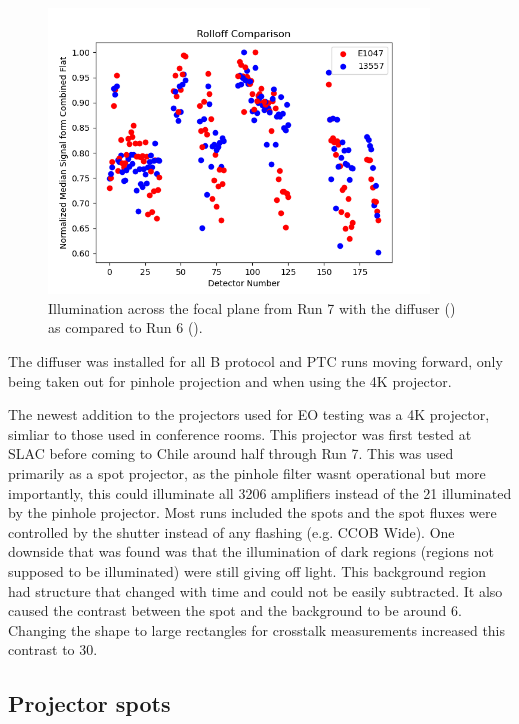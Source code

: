\begin{figure}
\centering
\includegraphics[width=0.9\textwidth]{sections/figures/Run7_DiffuserIllumination.png}
\caption{Illumination across the focal plane from Run 7 with the
diffuser () as compared to Run 6 ().}
\end{figure}

The diffuser was installed for all B protocol and PTC runs moving
forward, only being taken out for pinhole projection and when using the
4K projector.

The newest addition to the projectors used for EO testing was a 4K
projector, simliar to those used in conference rooms. This projector was
first tested at SLAC before coming to Chile around half through Run 7.
This was used primarily as a spot projector, as the pinhole filter
wasn\textquotesingle t operational but more importantly, this could
illuminate all 3206 amplifiers instead of the 21 illuminated by the
pinhole projector. Most runs included the spots and the spot fluxes were
controlled by the shutter instead of any flashing (e.g. CCOB Wide). One
downside that was found was that the illumination of
\textquotesingle dark\textquotesingle{} regions (regions not supposed to
be illuminated) were still giving off light. This background region had
structure that changed with time and could not be easily subtracted. It
also caused the contrast between the spot and the background to be
around 6. Changing the shape to large rectangles for crosstalk
measurements increased this contrast to 30.

\subsection{Projector spots}\label{projector-spots}


